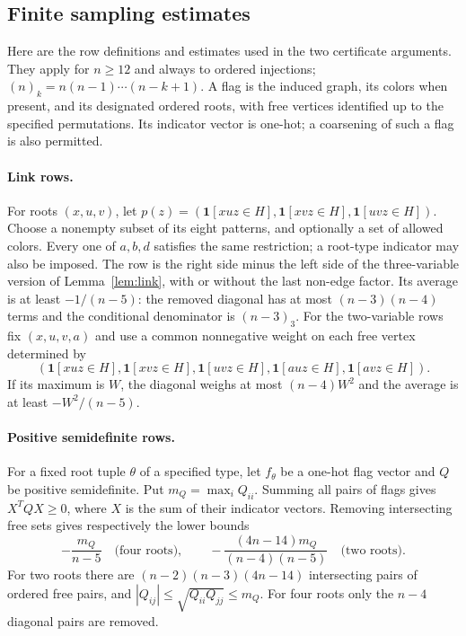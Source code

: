 \documentclass[11pt]{article}
\newcommand{\ind}{\mathbf 1}
\newcommand{\fall}[2]{(#1)_{#2}}
\begin{document}
\begin{appendices}
\section{Finite sampling estimates}\label{app:sampling}
Here are the row definitions and estimates used in the two certificate
arguments. They apply for $n\ge12$ and always to ordered injections;
$\fall n k=n(n-1)\cdots(n-k+1)$.
A flag is the induced graph, its colors when present, and its designated
ordered roots, with free vertices identified up to the specified
permutations. Its indicator vector is one-hot; a coarsening of such a
flag is also permitted.

\paragraph{Link rows.}
For roots $(x,u,v)$, let
$p(z)=(\ind[xuz\in H],\ind[xvz\in H],\ind[uvz\in H])$.
Choose a nonempty subset of its eight patterns, and optionally a set of
allowed colors. Every one of $a,b,d$ satisfies the same restriction;
a root-type indicator may also be imposed. The row is the right side
minus the left side of the three-variable version of
Lemma~\ref{lem:link}, with or without the last non-edge factor.
Its average is at least $-1/(n-5)$: the removed diagonal has at most
$(n-3)(n-4)$ terms and the conditional denominator is $\fall{n-3}3$.
For the two-variable rows fix $(x,u,v,a)$ and use a common nonnegative
weight on each free vertex determined by
\[
 (\ind[xuz\in H],\ind[xvz\in H],\ind[uvz\in H],
   \ind[auz\in H],\ind[avz\in H]).
\]
If its maximum is $W$, the diagonal weighs at most $(n-4)W^2$ and the
average is at least $-W^2/(n-5)$.

\paragraph{Positive semidefinite rows.}
For a fixed root tuple $\theta$ of a specified type, let $f_\theta$
be a one-hot flag vector and $Q$ be positive semidefinite. Put
$m_Q=\max_iQ_{ii}$. Summing all pairs of flags gives $X^TQX\ge0$,
where $X$ is the sum of their indicator vectors. Removing intersecting
free sets gives respectively the lower bounds
\[
 -\frac{m_Q}{n-5}\quad\text{(four roots)},\qquad
 -\frac{(4n-14)m_Q}{(n-4)(n-5)}\quad\text{(two roots)}.
\]
For two roots there are
$(n-2)(n-3)(4n-14)$ intersecting pairs of ordered free pairs, and
$|Q_{ij}|\le\sqrt{Q_{ii}Q_{jj}}\le m_Q$. For four roots only the
$n-4$ diagonal pairs are removed.


\end{appendices}
\end{document}
